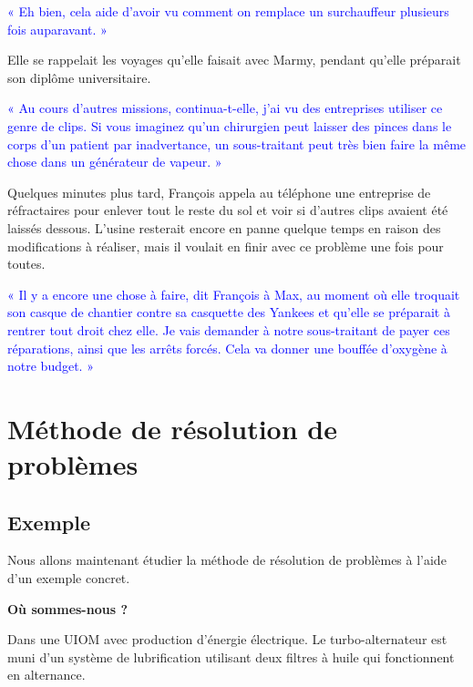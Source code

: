 \textcolor{blue}{« Eh bien, cela aide d’avoir vu comment on remplace un surchauffeur plusieurs fois auparavant. »}

Elle se rappelait les voyages qu’elle faisait avec Marmy, pendant qu’elle préparait son diplôme universitaire.
\vspace{0.3cm}

\textcolor{blue}{« Au cours d’autres missions, continua-t-elle, j’ai vu des entreprises utiliser ce genre de clips. Si vous imaginez qu’un chirurgien peut laisser des pinces dans le corps d’un patient par inadvertance, un sous-traitant peut très bien faire la même chose dans un générateur de vapeur. »}
\vspace{0.3cm}

Quelques minutes plus tard, François appela au téléphone une entreprise de réfractaires pour enlever tout le reste du sol et voir si d’autres clips avaient été laissés dessous. L’usine resterait encore en panne quelque temps en raison des modifications à réaliser, mais il voulait en finir avec ce problème une fois pour toutes.
\vspace{0.3cm}

\textcolor{blue}{« Il y a encore une chose à faire, dit François à Max, au moment où elle troquait son casque de chantier contre sa casquette des Yankees et qu’elle se préparait à rentrer tout droit chez elle. Je vais demander à notre sous-traitant de payer ces réparations, ainsi que les arrêts forcés. Cela va donner une bouffée d’oxygène à notre budget. »}


\section{	Méthode de résolution de problèmes}


\subsection{	Exemple}

Nous allons maintenant étudier la méthode de résolution de problèmes à l'aide d'un exemple concret.
\vspace{0.3cm}

\textbf{	Où sommes-nous ?}
\vspace{0.3cm}

Dans une UIOM avec production d’énergie électrique. Le turbo-alternateur est muni d’un système de lubrification utilisant deux filtres à huile qui fonctionnent en alternance.
\vspace{0.3cm}

